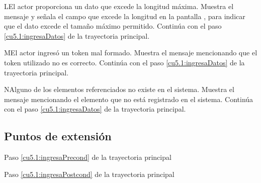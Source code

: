  \begin{UCtrayectoriaA}{L}{El actor proporciona un dato que excede la longitud máxima.}
    \UCpaso[\UCsist] Muestra el mensaje  y señala el campo que excede la 
    longitud en la pantalla , para indicar que el dato excede el tamaño máximo permitido.
    \UCpaso[] Continúa con el paso \ref{cu5.1:ingresaDatos} de la trayectoria principal.
 \end{UCtrayectoriaA}
 \begin{UCtrayectoriaA}{M}{El actor ingresó un token mal formado.}
    \UCpaso[\UCsist] Muestra el mensaje  mencionando que el token utilizado no es correcto.
    \UCpaso[] Continúa con el paso \ref{cu5.1:ingresaDatos} de la trayectoria principal.
 \end{UCtrayectoriaA}
 \begin{UCtrayectoriaA}{N}{Alguno de los elementos referenciados no existe en el sistema.}
    \UCpaso[\UCsist] Muestra el mensaje  mencionando el elemento que no está registrado en el sistema.
    \UCpaso[] Continúa con el paso \ref{cu5.1:ingresaDatos} de la trayectoria principal.
 \end{UCtrayectoriaA}
 

\subsection{Puntos de extensión}	
	{Paso \ref{cu5.1:ingresaPrecond} de la trayectoria principal}
	{}
	
	{Paso \ref{cu5.1:ingresaPostcond} de la trayectoria principal}
	{}